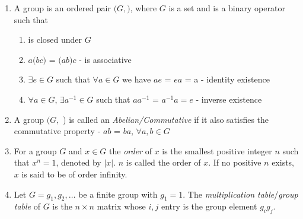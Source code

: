 \documentclass[titlepage, 12pt]{article}
\begin{document}
\begin{enumerate}

	\item A group is an ordered pair $(G,$$)$, where $G$ is a set and
		 is a binary operator such that

		\begin{enumerate}

			\item {} is closed under $G$

			\item $a$\ding{72}$(b$$c)$ = $(a$\ding{72}$b)$$c$
				-  is associative

			\item $\exists e\in G$ such that $\forall a\in G$ we have
				$a$\ding{72}$e$ = $e$$a$ = a - identity existence

			\item $\forall a\in G$, $\exists a^{-1}\in G$ such that
				$a$$a^{-1}$ = $a^{-1}$$a = e$ - inverse
				existence

		\end{enumerate}

	\item A group $(G,$ ) is called an \textit{Abelian/Commutative} if
		it also satisfies the commutative property - $a$$b$ =
		$b$$a$, $\forall a, b\in G$

	\item For a group $G$ and $x\in G$ the \textit{order} of $x$ is the smallest
		positive integer $n$ such that $x^n = 1$, denoted by $|x|$. $n$ is
		called the order of $x$. If no positive $n$ exists, $x$ is said to be of
		order infinity.

	\item Let $G = {g_1, g_2,\ldots}$ be a finite group with $g_1 = 1$. The
		\textit{multiplication table}/\textit{group table} of $G$ is the
		$n\times n$ matrix whose $i, j$ entry is the group element $g_ig_j$.

\end{enumerate}
\end{document}
